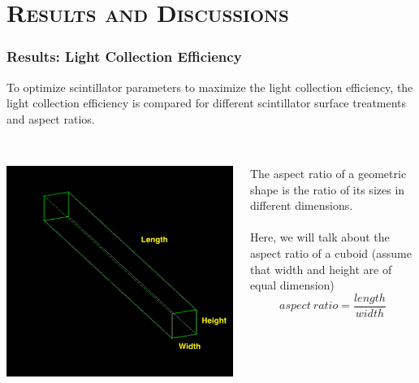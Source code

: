 \documentclass[xcolor=x11names, compress, handout]{beamer}
\renewcommand{\(}{\begin{columns}}
\renewcommand{\)}{\end{columns}}
\newcommand{\<}[1]{\begin{column}{#1}}
\renewcommand{\>}{\end{column}}
\begin{document}
\section{\scshape Results and Discussions}
\begin{frame}
\frametitle{Results: Light Collection Efficiency}
To optimize scintillator parameters to maximize the light collection efficiency, the light collection efficiency is compared for different scintillator surface treatments and aspect ratios. \\
\ \\

\begin{columns}
\begin{column}{0.5\textwidth}
\includegraphics[width=\textwidth]{images/aspect_ratio.png}
\end{column}
\begin{column}{0.5\textwidth}
The aspect ratio of a geometric shape is the ratio of its sizes in different dimensions. \\
\ \\
Here, we will talk about the aspect ratio of a cuboid (assume that width and height are of equal dimension)
$$ aspect ~ratio = \frac{length}{width} $$ 
\end{column}
\end{columns}
\end{frame}
\end{document}
